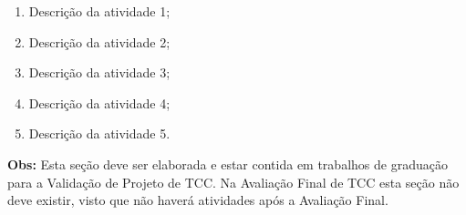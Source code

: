 \documentclass[
	article,			%
	11pt,				%
	oneside,			%
	a4paper,			%
	chapter=TITLE,		%
	section=TITLE,		%
	english,			%
	brazil,				%
	sumario=tradicional
]{abntex2}
\begin{document}
	\begin{enumerate}
		\item Descrição da atividade 1;
		\item Descrição da atividade 2;
		\item Descrição da atividade 3;
		\item Descrição da atividade 4;
		\item Descrição da atividade 5.
	\end{enumerate}
	
	\textbf{Obs:} Esta seção deve ser elaborada e estar contida em trabalhos de graduação para a Validação de Projeto de TCC. Na Avaliação Final de TCC esta seção não deve existir, visto que não haverá atividades após a Avaliação Final.
	
	
	\postextual
	
	
	\begin{folhadeaprovacao}
		
	\end{folhadeaprovacao}
\end{document}
